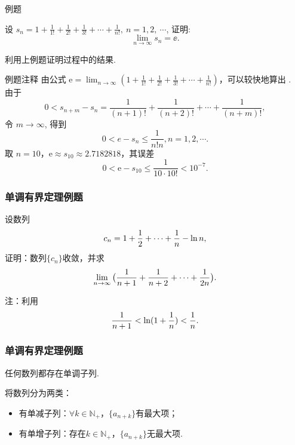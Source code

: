 \documentclass[mathserif]{beamer}
\begin{document}
\begin{frame}[label=li_bc3]{例题}%
	\begin{ex}
		\suojin 设 $s_n=1+\frac{1}{1 !}+\frac{1}{2 !}+\frac{1}{3 !}+\cdots+\frac{1}{n !},\ n=1,2,\ \cdots$, 证明:
		$$
		\lim _{n \rightarrow \infty} s_n=\ee .
		$$ 
	\end{ex}
\jiange

\suojin  利用上例题证明过程中的结果.\\
\hfill\hyperlink{li_bc3jd<1>}{}
\end{frame}


\begin{frame}{例题注释}%
	\suojin 由公式 $\mathrm{e}=\lim _{n \rightarrow \infty}\left(1+\frac{1}{1 !}+\frac{1}{2 !}+\frac{1}{3 !}+\cdots+\frac{1}{n !}\right)$，可以较快地算出 .  \\
	\suojin 由于
	$$
	0<s_{n+m}-s_n=\frac{1}{(n+1) !}+\frac{1}{(n+2) !}+\cdots+\frac{1}{(n+m) !},
	$$
	令 $m \rightarrow \infty$, 得到
	$$
	0<e-s_n \leq \frac{1}{n ! n}, n=1,2, \cdots .
	$$
	\suojin 取 $n=10$，$\mathrm{e} \approx s_{10} \approx 2.7182818$，其误差
	$$
	0<\mathrm{e}-s_{10} \leqslant \frac{1}{10 \cdot 10 !}<10^{-7}.
	$$
\end{frame}







\begin{frame}[label=li_bc]
\frametitle{单调有界定理例题}
\begin{ex}
\suojin 设数列$$c_{n}=1+\frac{1}{2}+\cdots+\frac{1}{n}-\ln n,$$
证明：数列$\{c_{n}\}$收敛，并求
$$\lim_{n\rightarrow\infty}\big(\frac{1}{n+1}+\frac{1}{n+2}+\cdots+\frac{1}{2n}\big).$$
\end{ex}
\suojin 注：利用$$\frac{1}{n+1}<\ln (1+\frac{1}{n})<\frac{1}{n}.$$
\hfill \hyperlink{li_bcjd<1>}{}
\end{frame}




\begin{frame}[label=li_5]
\frametitle{单调有界定理例题}
\begin{ex}[5]
\suojin 任何数列都存在单调子列.
\end{ex}

\suojin 将数列分为两类：
\begin{itemize}
\item 有单减子列：$\forall k\in\mathbb{N}_{+}$，$\{a_{n+k}\}$有最大项；
\item 有单增子列：存在$k\in\mathbb{N}_{+}$，$\{a_{n+k}\}$无最大项.
\end{itemize}

\hfill\hyperlink{li_5jd<1>}{}
\end{frame}
\end{document}
